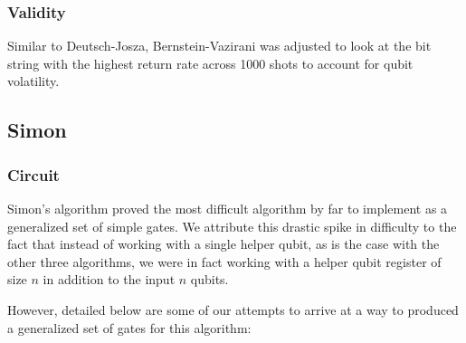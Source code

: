 \documentclass[12pt]{article}
\begin{document}

\subsubsection*{Validity}
Similar to Deutsch-Josza, Bernstein-Vazirani was adjusted to look at the bit string with the highest return rate across 1000 shots to account for qubit volatility.

\subsection{Simon}

\subsubsection*{Circuit}
Simon's algorithm proved the most difficult algorithm by far to implement as a generalized set of simple gates.
We attribute this drastic spike in difficulty to the fact that instead of working with a single helper qubit, as is the case with the other three algorithms, we were in fact working with a helper qubit register of size $n$ in addition to the input $n$ qubits.

However, detailed below are some of our attempts to arrive at a way to produced a generalized set of gates for this algorithm:
\end{document}
